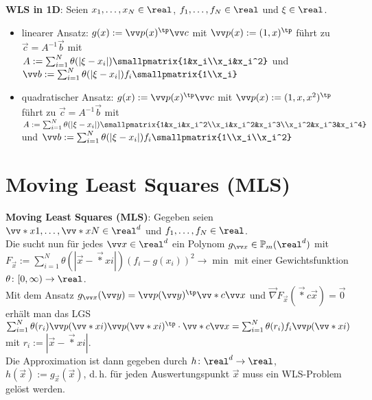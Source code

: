 \textbf{WLS in 1D}:
Seien $x_1, \dotsc, x_N \in \real$, $f_1, \dotsc, f_N \in \real$ und $\xi \in \real$.
\begin{itemize}
    \item
    linearer Ansatz:
    $g(x) := \vec{p}(x)^\tp \vec{c}$ mit $\vec{p}(x) := (1, x)^\tp$
    führt zu $\vec{c} = A^{-1} \vec{b}$ mit\\
    $A := \sum_{i=1}^N \theta(|\xi - x_i|) \smallpmatrix{1&x_i\\x_i&x_i^2}$ und
    $\vec{b} := \sum_{i=1}^N \theta(|\xi - x_i|) f_i \smallpmatrix{1\\x_i}$

    \item
    quadratischer Ansatz:
    $g(x) := \vec{p}(x)^\tp \vec{c}$ mit $\vec{p}(x) := (1, x, x^2)^\tp$
    führt zu $\vec{c} = A^{-1} \vec{b}$ mit\\
    $A := \sum_{i=1}^N \theta(|\xi - x_i|)
    \smallpmatrix{1&x_i&x_i^2\\x_i&x_i^2&x_i^3\\x_i^2&x_i^3&x_i^4}$ und
    $\vec{b} := \sum_{i=1}^N \theta(|\xi - x_i|) f_i \smallpmatrix{1\\x_i\\x_i^2}$
\end{itemize}

\pagebreak

\section{%
    Moving Least Squares (MLS)%
}

\textbf{Moving Least Squares (MLS)}:
Gegeben seien $\vec*{x}{1}, \dotsc, \vec*{x}{N} \in \real^d$ und
$f_1, \dotsc, f_N \in \real$.\\
Die  sucht nun für jedes $\vec{x} \in \real^d$
ein Polynom $g_{\vec{x}} \in \PP_m(\real^d)$ mit\\
$F_{\vec{x}} := \sum_{i=1}^N \theta(|\vec{x} - \vec*{x}{i}|) (f_i - g(x_i))^2 \to \min$
mit einer Gewichtsfunktion $\theta\colon [0, \infty) \to \real$.\\
Mit dem Ansatz $g_{\vec{x}}(\vec{y}) = \vec{p}(\vec{y})^\tp \vec*{c}{\vec{x}}$ und
$\vec{\nabla} F_{\vec{x}}(\vec*{c}{\vec{x}}) = \vec{0}$ erhält man das LGS\\
$\sum_{i=1}^N \theta(r_i) \vec{p}(\vec*{x}{i}) \vec{p}(\vec*{x}{i})^\tp \cdot \vec*{c}{\vec{x}}
= \sum_{i=1}^N \theta(r_i) f_i \vec{p}(\vec*{x}{i})$ mit $r_i := |\vec{x} - \vec*{x}{i}|$.\\
Die Approximation ist dann gegeben durch
$h\colon \real^d \to \real$, $h(\vec{x}) := g_{\vec{x}}(\vec{x})$,
d.\,h. für jeden Auswertungspunkt $\vec{x}$ muss ein WLS-Problem gelöst werden.


